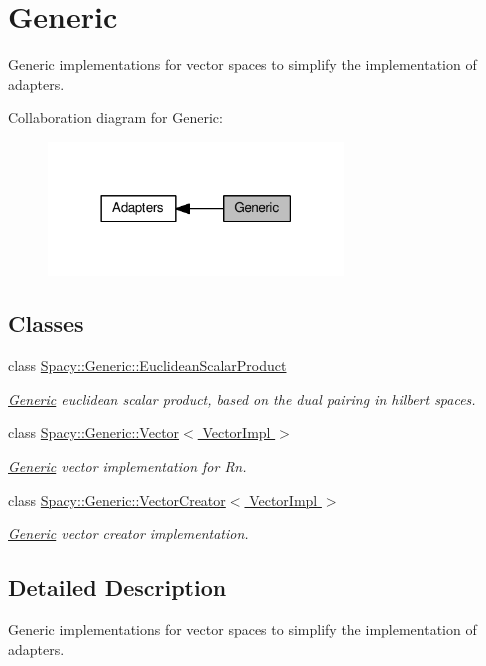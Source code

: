 \hypertarget{group__GenericGroup}{}\section{Generic}
\label{group__GenericGroup}


Generic implementations for vector spaces to simplify the implementation of adapters.  


Collaboration diagram for Generic\+:\nopagebreak
\begin{figure}[H]
\begin{center}
\leavevmode
\includegraphics[width=222pt]{group__GenericGroup}
\end{center}
\end{figure}
\subsection*{Classes}
\begin{DoxyCompactItemize}
\item 
class \hyperlink{classSpacy_1_1Generic_1_1EuclideanScalarProduct}{Spacy\+::\+Generic\+::\+Euclidean\+Scalar\+Product}
\begin{DoxyCompactList}\small\item\em \hyperlink{namespaceSpacy_1_1Generic}{Generic} euclidean scalar product, based on the dual pairing in hilbert spaces. \end{DoxyCompactList}\item 
class \hyperlink{classSpacy_1_1Generic_1_1Vector}{Spacy\+::\+Generic\+::\+Vector$<$ Vector\+Impl $>$}
\begin{DoxyCompactList}\small\item\em \hyperlink{namespaceSpacy_1_1Generic}{Generic} vector implementation for Rn. \end{DoxyCompactList}\item 
class \hyperlink{classSpacy_1_1Generic_1_1VectorCreator}{Spacy\+::\+Generic\+::\+Vector\+Creator$<$ Vector\+Impl $>$}
\begin{DoxyCompactList}\small\item\em \hyperlink{namespaceSpacy_1_1Generic}{Generic} vector creator implementation. \end{DoxyCompactList}\end{DoxyCompactItemize}


\subsection{Detailed Description}
Generic implementations for vector spaces to simplify the implementation of adapters. 

